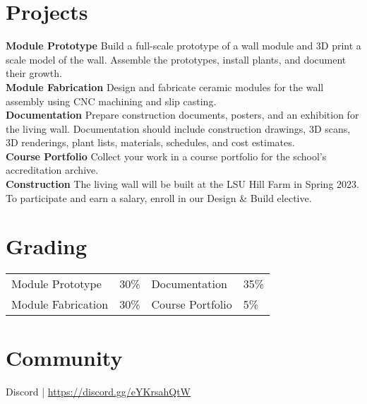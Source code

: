 \documentclass[11pt,article,oneside]{memoir}
\begin{document}

\section{Projects}

\noindent \textbf{Module Prototype}
Build a full-scale prototype of a wall module
and 3D print a scale model of the wall.
Assemble the prototypes, 
install plants, 
and document their growth.
\\

\noindent \textbf{Module Fabrication}
Design and fabricate ceramic modules for the wall assembly
using CNC machining and slip casting.
\\

\noindent \textbf{Documentation}
Prepare construction documents,
posters, and an exhibition for the living wall.
Documentation should include 
construction drawings, 3D scans, 3D renderings,
plant lists, materials, schedules, and cost estimates.
\\

\noindent \textbf{Course Portfolio}
Collect your work in a course portfolio 
for the school's accreditation archive.
\\

\noindent \textbf{Construction}
The living wall will be built at the LSU Hill Farm in Spring 2023.
To participate and earn a salary, enroll in our Design \& Build elective.

\section{Grading}
\vspace*{-0.4cm}
\begin{table}[H]
\begin{tabular}{@{}l r @{\hskip 2cm} l @{\hskip 0.5cm} l}
Module Prototype & 30\% & Documentation & 35\% \\
Module Fabrication & 30\% & Course Portfolio & 5\% \\
\end{tabular}
\end{table}

\section{Community}
Discord | \url{https://discord.gg/eYKrsahQtW}
\end{document}

